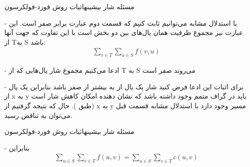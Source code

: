 \begin{itemframe}{مسئله شار بیشینه}{اثبات روش فورد-فولکرسون}
\item[-]
با استدلال مشابه می‌توانیم ثابت کنیم که قسمت دوم عبارت برابر صفر است. این عبارت نیز مجموع ظرفیت همان یال‌های بین دو بخش است با این تفاوت که جهت آنها از T‌به S باشد:
\begin{align*}
\sum_{v \in T} \sum_{u \in S} f(v, u)
\end{align*}
\item[-]
ادعا می‌کنیم مجموع شار یال‌هایی که از T به S می‌روند صفر است
\item[-]
برای اثبات این ادعا فرض کنید شار یک یال از
به
بیشتر از صفر باشد بنابراین یک یال از x به y باید در گراف متمم وجود داشته باشد که نشان دهنده امکان کاهش شار است (طبق ). حال که نتیجه گرفتیم از x به y مسیر وجود دارد با استدلال مشابه قسمت قبل می‌توان به تناقض رسید.
\end{itemframe}


\begin{itemframe}{مسئله شار بیشینه}{اثبات روش فورد-فولکرسون}
\item[-]
بنابراین
\begin{align*}
\sum_{u \in S} \sum_{v \in T} f(u, v) = \sum_{u \in S} \sum_{v \in T} c(u, v)
\end{align*}
\end{itemframe}